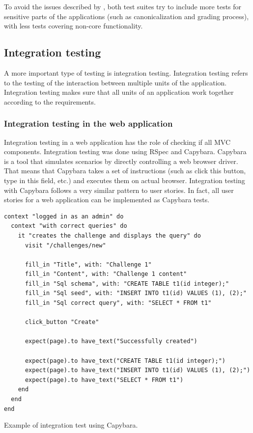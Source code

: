 To avoid the issues described by \cite{msft_testing}, both test suites try to include more tests for sensitive parts of the applications (such as canonicalization and grading process), with less tests covering non-core functionality.

\subsection{Integration testing}

A more important type of testing is integration testing. Integration testing refers to the testing of the interaction between multiple units of the application. Integration testing makes sure that all units of an application work together according to the requirements.

\subsubsection{Integration testing in the web application}

Integration testing in a web application has the role of checking if all MVC components. Integration testing was done using RSpec and Capybara. Capybara is a tool that simulates scenarios by directly controlling a web browser driver. That means that Capybara takes a set of instructions (such as click this button, type in this field, etc.) and executes them on actual browser. Integration testing with Capybara follows a very similar pattern to user stories. In fact, all user stories for a web application can be implemented as Capybara tests.

\begin{code}
\begin{verbatim}
context "logged in as an admin" do
  context "with correct queries" do
    it "creates the challenge and displays the query" do
      visit "/challenges/new"

      fill_in "Title", with: "Challenge 1"
      fill_in "Content", with: "Challenge 1 content"
      fill_in "Sql schema", with: "CREATE TABLE t1(id integer);"
      fill_in "Sql seed", with: "INSERT INTO t1(id) VALUES (1), (2);"
      fill_in "Sql correct query", with: "SELECT * FROM t1"

      click_button "Create"

      expect(page).to have_text("Successfully created")

      expect(page).to have_text("CREATE TABLE t1(id integer);")
      expect(page).to have_text("INSERT INTO t1(id) VALUES (1), (2);")
      expect(page).to have_text("SELECT * FROM t1")
    end
  end
end
\end{verbatim}
\caption{Example of integration test using Capybara.}
\end{code}

